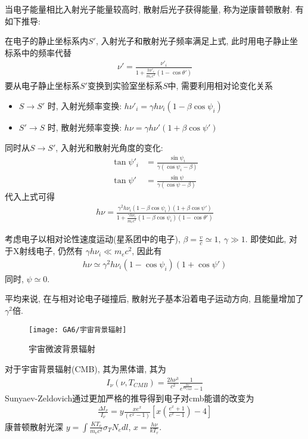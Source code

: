 当电子能量相比入射光子能量较高时, 散射后光子获得能量, 称为逆康普顿散射. 有如下推导: 

在电子的静止坐标系内$S'$, 入射光子和散射光子频率满足上式, 此时用电子静止坐标系中的频率代替
\begin{align*}
    \nu'=\frac{\nu'_i}{1+\frac{h\nu'_i}{m_e c^2}(1-\cos\theta')}
\end{align*}
要从电子静止坐标系$S'$变换到实验室坐标系$S$中, 需要利用相对论变化关系
\begin{itemize}\small
    \item $S\rightarrow S'$ 时, 入射光频率变换: $h\nu'_i=\gamma h\nu_i(1-\beta\cos\psi_i)$
    \item $S'\rightarrow S$ 时, 散射光频率变换: $h\nu=\gamma h\nu'(1+\beta \cos\psi')$
\end{itemize}
同时从$S\rightarrow S'$, 入射光和散射光角度的变化:
\begin{align*}
    \tan \psi'_i&=\frac{\sin\psi_i}{\gamma(\cos\psi_i-\beta)}\\
    \tan \psi'&=\frac{\sin\psi}{\gamma(\cos\psi-\beta)}
\end{align*}
代入上式可得
\begin{align*}
    h\nu=\frac{\gamma^2h\nu_i(1-\beta\cos\psi_i)(1+\beta \cos\psi')}{1+\frac{\gamma h\nu_i}{m_e c^2}(1-\beta\cos\psi_i)(1-\cos\theta')}
\end{align*}

考虑电子以相对论性速度运动(星系团中的电子), $\beta=\frac{v}{c}\simeq  1,\ \gamma\gg 1$. 即使如此, 对于X射线电子, 仍然有 $\gamma h \nu_i \ll m_e c^2$, 因此有
\begin{align*}
    h\nu \simeq \gamma^2 h\nu_i (1-\cos\psi_i)(1+\cos\psi')
\end{align*}
同时, $\psi\simeq 0$. 

平均来说, 在与相对论电子碰撞后, 散射光子基本沿着电子运动方向, 且能量增加了$\gamma^2$倍. 

\begin{figure}[!htb]
    \centering
    \texttt{[image: GA6/宇宙背景辐射]}
    \caption{宇宙微波背景辐射}
\end{figure}

对于宇宙背景辐射(CMB), 其为黑体谱, 其为
\begin{align*}
    I_{\nu}(\nu, T_{CMB})=\frac{2h\nu^3}{c^2}\frac{1}{e^{\frac{h\nu}{kT_{CMB}}}-1}
\end{align*}
Sunyaev-Zeldovich通过更加严格的推导得到电子对cmb能谱的改变为
\begin{align*}
    \frac{\Delta I_\nu}{I_\nu}=y\frac{xe^x}{(e^x-1)}\left[ x\left( \frac{e^x+1}{e^x-1} \right)-4 \right]
\end{align*}
康普顿散射光深 $y=\int \frac{K T_e}{m_e c^2}\sigma_T N_e dl$, $x=\frac{h\nu}{kT_r}$. 

